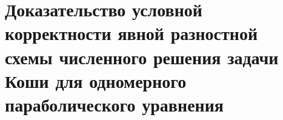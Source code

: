 \documentclass[__main__.tex]{subfiles}
\begin{document}
\section{Доказательство условной корректности явной разностной схемы численного решения задачи Коши для одномерного параболического уравнения}
\end{document}
